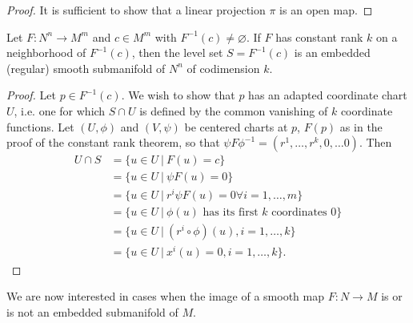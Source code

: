 \begin{proof}
It is sufficient to show that a linear projection $\pi$ is an open map.
\end{proof}

\begin{theorem}
Let $F: N^n \to M^m$ and $c \in M^m$ with $F^{-1}(c) \neq
\varnothing$. If $F$ has constant rank $k$ on a neighborhood of
$F^{-1}(c)$, then the level set $S = F^{-1}(c)$ is an embedded
(regular) smooth submanifold of $N^n$ of codimension $k$.
\end{theorem}

\begin{proof}
Let $p \in F^{-1}(c)$. We wish to show that $p$ has an adapted
coordinate chart $U$, i.e. one for which $S \cap U$ is defined by the
common vanishing of $k$ coordinate functions. Let $(U, \phi)$ and
$(V, \psi)$ be centered charts at $p$, $F(p)$ as in the proof of the
constant rank theorem, so that
$\psi F \phi^{-1} = (r^1, \dots, r^k, 0, \dots 0)$. Then
\begin{align*}
   U \cap S
&= \{ u \in U ~\vert~ F(u) = c \} \\
&= \{ u \in U ~\vert~ \psi F(u) = 0 \} \\
&= \{ u \in U ~\vert~ r^i \psi F(u) = 0 \forall i = 1, \dots, m \} \\
&= \{ u \in U ~\vert~ \phi(u) \text{ has its first $k$ coordinates 0}
   \} \\
&= \{ u \in U ~\vert~ (r^i \circ \phi)(u), i=1, \dots, k \} \\
&= \{ u \in U ~\vert~ x^i(u) = 0, i=1, \dots, k \}.
\end{align*}
\end{proof}

We are now interested in cases when the image of a smooth map $F: N
\to M$ is or is not an embedded submanifold of $M$.

